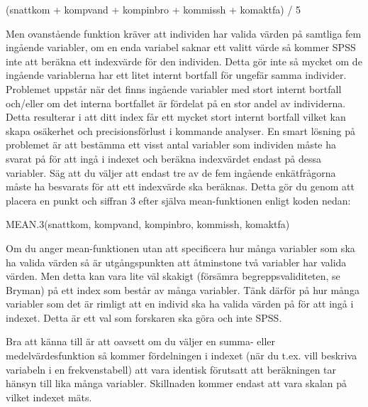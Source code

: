 \documentclass[
]{book}
\newenvironment{Shaded}{\begin{snugshade}}{\end{snugshade}}
\newcommand{\DecValTok}[1]{\textcolor[rgb]{0.00,0.00,0.81}{#1}}
\newcommand{\FunctionTok}[1]{\textcolor[rgb]{0.00,0.00,0.00}{#1}}
\newcommand{\NormalTok}[1]{#1}
\newcommand{\SpecialCharTok}[1]{\textcolor[rgb]{0.00,0.00,0.00}{#1}}
\begin{document}
\begin{Shaded}
\begin{Highlighting}[]
\NormalTok{(snattkom }\SpecialCharTok{+}\NormalTok{ kompvand }\SpecialCharTok{+}\NormalTok{ kompinbro }\SpecialCharTok{+}\NormalTok{ kommissh }\SpecialCharTok{+}\NormalTok{ komaktfa) }\SpecialCharTok{/} \DecValTok{5}
\end{Highlighting}
\end{Shaded}

Men ovanstående funktion kräver att individen har valida värden på samtliga fem ingående variabler,
om en enda variabel saknar ett valitt värde så kommer SPSS inte att beräkna ett indexvärde för den
individen. Detta gör inte så mycket om de ingående variablerna har ett litet internt bortfall för ungefär
samma individer. Problemet uppstår när det finns ingående variabler med stort internt bortfall och/eller
om det interna bortfallet är fördelat på en stor andel av individerna. Detta resulterar i att ditt index får
ett mycket stort internt bortfall vilket kan skapa osäkerhet och precisionsförlust i kommande analyser.
En smart lösning på problemet är att bestämma ett visst antal variabler som individen måste ha svarat
på för att ingå i indexet och beräkna indexvärdet endast på dessa variabler. Säg att du väljer att endast
tre av de fem ingående enkätfrågorna måste ha besvarats för att ett indexvärde ska beräknas. Detta gör
du genom att placera en punkt och siffran 3 efter själva mean-funktionen enligt koden nedan:

\begin{Shaded}
\begin{Highlighting}[]
\FunctionTok{MEAN.3}\NormalTok{(snattkom, kompvand, kompinbro, kommissh, komaktfa)}
\end{Highlighting}
\end{Shaded}

Om du anger mean-funktionen utan att specificera hur många variabler som ska ha valida värden så är
utgångspunkten att åtminstone två variabler har valida värden. Men detta kan vara lite väl skakigt
(försämra begreppsvaliditeten, se Bryman) på ett index som består av många variabler. Tänk därför på
hur många variabler som det är rimligt att en individ ska ha valida värden på för att ingå i indexet. Detta
är ett val som forskaren ska göra och inte SPSS.

Bra att känna till är att oavsett om du väljer en summa- eller medelvärdesfunktion så kommer
fördelningen i indexet (när du t.ex. vill beskriva variabeln i en frekvenstabell) att vara identisk förutsatt att beräkningen tar hänsyn till lika många variabler. Skillnaden kommer endast att vara skalan på vilket indexet mäts.
\end{document}
